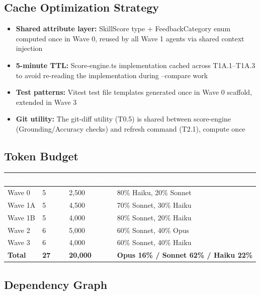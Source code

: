 \documentclass[11pt,letterpaper]{article}
\newcommand{\tableheader}[1]{\textbf{\sffamily\textcolor{white}{#1}}}
\begin{document}
\subsection{Cache Optimization Strategy}

\begin{itemize}[leftmargin=1.5em]
  \item \textbf{Shared attribute layer:} SkillScore type + FeedbackCategory enum computed once in Wave 0, reused by all Wave 1 agents via shared context injection
  \item \textbf{5-minute TTL:} Score-engine.ts implementation cached across T1A.1--T1A.3 to avoid re-reading the implementation during --compare work
  \item \textbf{Test patterns:} Vitest test file templates generated once in Wave 0 scaffold, extended in Wave 3
  \item \textbf{Git utility:} The git-diff utility (T0.5) is shared between score-engine (Grounding/Accuracy checks) and refresh command (T2.1), compute once
\end{itemize}

\subsection{Token Budget}

\begin{center}
\begin{tabularx}{\textwidth}{L{3cm}C{2cm}C{2.5cm}C{2.5cm}}
\toprule
{}
\tableheader{Wave} & \tableheader{Tasks} & \tableheader{Est. Tokens} & \tableheader{Model Mix} \\
\midrule
Wave 0 & 5 & 2,500 & 80\% Haiku, 20\% Sonnet \\
Wave 1A & 5 & 4,500 & 70\% Sonnet, 30\% Haiku \\
Wave 1B & 5 & 4,000 & 80\% Sonnet, 20\% Haiku \\
Wave 2 & 6 & 5,000 & 60\% Sonnet, 40\% Opus \\
Wave 3 & 6 & 4,000 & 60\% Sonnet, 40\% Haiku \\
\textbf{Total} & \textbf{27} & \textbf{20,000} & \textbf{Opus 16\% / Sonnet 62\% / Haiku 22\%} \\
\bottomrule
\end{tabularx}
\end{center}

\subsection{Dependency Graph}
\end{document}

